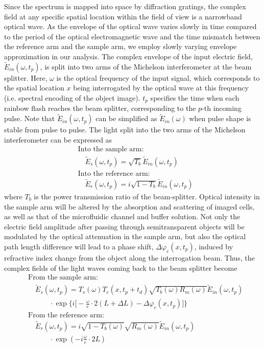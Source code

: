 \documentclass[aps,pra,reprint,longbibliography,superscriptaddress]{revtex4-1}
\begin{document}
Since the spectrum is mapped into space by diffraction gratings, the complex field at any specific spatial location within the field of view is a narrowband optical wave. As the envelope of the optical wave varies slowly in time compared to the period of the optical electromagnetic wave and the time mismatch between the reference arm and the sample arm, we employ slowly varying envelope approximation in our analysis. The complex envelope of the input electric field, $\tilde{E}_{in}(\omega, t_p)$, is split into two arms of the Michelson interferometer at the beam splitter. Here, $\omega$ is the optical frequency of the input signal, which corresponds to the spatial location $x$ being interrogated by the optical wave at this frequency (i.e. spectral encoding of the object image). $t_p$ specifies the time when each rainbow flash reaches the beam splitter, corresponding to the $p$-th incoming pulse. Note that $\tilde{E}_{in}(\omega,t_p)$ can be simplified as $\tilde{E}_{in}(\omega)$ when pulse shape is stable from pulse to pulse. The light split into the two arms of the Michelson interferometer can be expressed as
\begin{equation}
\begin{split}
&\text{Into the sample arm:} \\
&\quad \tilde{E}_s(\omega, t_p) = \sqrt{T_b} \tilde{E}_{in}(\omega, t_p)  \\
&\text{Into the reference arm:} \\
&\quad \tilde{E}_r(\omega, t_p) = i \sqrt{1-T_b} \tilde{E}_{in}(\omega, t_p)
\end{split}
\end{equation}
where $T_b$ is the power transmission ratio of the beam-splitter. Optical intensity in the sample arm will be altered by the absorption and scattering of imaged cells, as well as that of the microfluidic channel and buffer solution. Not only the electric field amplitude after passing through semitransparent objects will be modulated by the optical attenuation in the sample arm, but also the optical path length difference will lead to a phase shift, $\Delta\varphi_c(x,t_p)$, induced by refractive index change from the object along the interrogation beam. Thus, the complex fields of the light waves coming back to the beam splitter become
\begin{equation}
\begin{split}
&\text{From the sample arm:}\\
&\quad \tilde{E}_s(\omega, t_p) = T_s(\omega) T_c(x,t_p + t_d) \sqrt{T_b(\omega) R_m(\omega)} \tilde{E}_{in}(\omega, t_p) \\
&\quad\quad\quad \cdot \exp \Big\lbrace i\Big[-\frac{\omega}{c} \cdot 2(L+\Delta L) - \Delta\varphi_c(x,t_p)\Big] \Big\rbrace\\
&\text{From the reference arm:} \\
&\quad \tilde{E}_r(\omega, t_p) = i \sqrt{1-T_b(\omega)} \sqrt{R_m(\omega)} \tilde{E}_{in}(\omega, t_p) \\
&\quad\quad\quad \cdot \exp(- i \frac{\omega}{c}\cdot 2L)
\end{split}
\end{equation}
\end{document}
